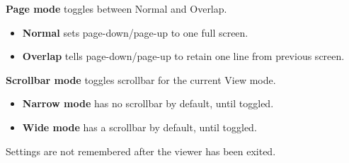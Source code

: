 \begin{itemize}
{\item\textbf{Page mode} toggles between Normal and Overlap.
    \begin{itemize}
        \item\textbf{Normal} sets page{}-down/page{}-up to one full screen.
        \item\textbf{Overlap} tells page{}-down/page{}-up to retain one line from previous screen.    
    \end{itemize}
\item\textbf{Scrollbar mode} toggles scrollbar for the current View mode.
    \begin{itemize}
        \item\textbf{Narrow mode} has no scrollbar by default, until toggled.
        \item\textbf{Wide mode} has a scrollbar by default, until toggled.
    \end{itemize}
}
\end{itemize}
Settings are not remembered after the viewer has been exited.

